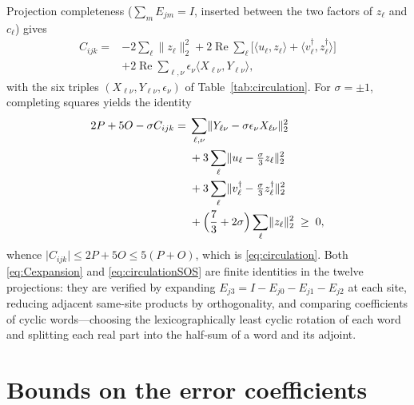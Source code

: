 \documentclass[aps,prl,reprint,superscriptaddress,longbibliography,floatfix,raggedbottom]{revtex4-2}
\newcommand{\norm}[1]{\lVert #1\rVert}
\newcommand{\abs}[1]{\lvert #1\rvert}
\newcommand{\ip}[2]{\langle #1,#2\rangle}
\begin{document}
Projection completeness ($\sum_mE_{jm}=I$, inserted between the two
factors of $z_\ell$ and $c_\ell$) gives
\begin{equation}\label{eq:Cexpansion}
\begin{split}
C_{ijk}={}&{-2}\sum_\ell\norm{z_\ell}_2^2
+2\operatorname{Re}\sum_\ell
\bigl[\ip{u_\ell}{z_\ell}
+\ip{v_\ell^\dagger}{z_\ell^\dagger}\bigr]\\
&+2\operatorname{Re}\sum_{\ell,\nu}
\epsilon_\nu\ip{X_{\ell\nu}}{Y_{\ell\nu}},
\end{split}
\end{equation}
with the six triples $(X_{\ell\nu},Y_{\ell\nu},\epsilon_\nu)$ of
Table~\ref{tab:circulation}. For $\sigma=\pm1$, completing squares
yields the identity
\begin{equation}\label{eq:circulationSOS}
\begin{split}
2P+5O-\sigma C_{ijk}
={}&\sum_{\ell,\nu}
\norm{Y_{\ell\nu}-\sigma\epsilon_\nu X_{\ell\nu}}_2^2\\
&+3\sum_\ell\norm{u_\ell-\tfrac\sigma3z_\ell}_2^2\\
&+3\sum_\ell\norm{v_\ell^\dagger-\tfrac\sigma3z_\ell^\dagger}_2^2\\
&+\Bigl(\frac73+2\sigma\Bigr)
\sum_\ell\norm{z_\ell}_2^2\;\ge\;0,
\end{split}
\end{equation}
whence $\abs{C_{ijk}}\le2P+5O\le5(P+O)$, which is
\eqref{eq:circulation}. Both \eqref{eq:Cexpansion} and
\eqref{eq:circulationSOS} are finite identities in the twelve
projections: they are verified by expanding
$E_{j3}=I-E_{j0}-E_{j1}-E_{j2}$ at each site, reducing adjacent
same-site products by orthogonality, and comparing coefficients of
cyclic words---choosing the lexicographically least cyclic rotation of
each word and splitting each real part into the half-sum of a word and
its adjoint.



\section{Bounds on the error coefficients}\label{app:scalar}
\end{document}
